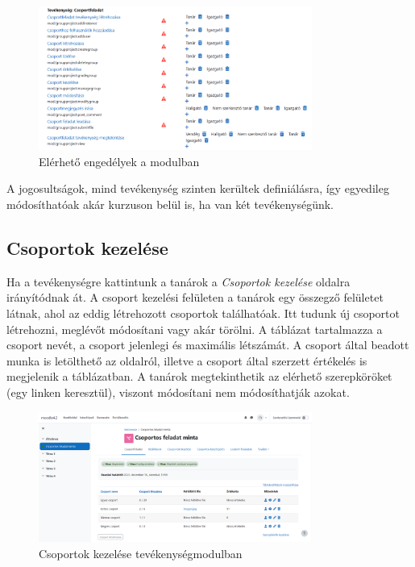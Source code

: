 \begin{figure}[H]
	\centering
	\includegraphics[width=0.8\textwidth,frame]{images/engedelyek.png}
	\caption{Elérhető engedélyek a modulban}
\end{figure}

A jogosultságok, mind tevékenység szinten kerültek definiálásra, így egyedileg módosíthatóak akár kurzuson belül is, ha van két tevékenységünk.

\subsection{Csoportok kezelése}

Ha a tevékenységre kattintunk a tanárok a \textit{Csoportok kezelése }oldalra irányítódnak át. A csoport kezelési felületen a tanárok egy összegző felületet látnak, ahol az eddig létrehozott csoportok találhatóak. Itt tudunk új csoportot létrehozni, meglévőt módosítani vagy akár törölni. A táblázat tartalmazza a csoport nevét, a csoport jelenlegi és maximális létszámát. A csoport által beadott munka is letölthető az oldalról, illetve a csoport által szerzett értékelés is megjelenik a táblázatban. A tanárok megtekinthetik az elérhető szerepköröket (egy linken keresztül), viszont módosítani nem módosíthatják azokat.

\begin{figure}[H]
	\centering
	\includegraphics[width=0.8\textwidth,frame]{images/csoportok_kezelese.png}
	\caption{Csoportok kezelése tevékenységmodulban}
\end{figure}

